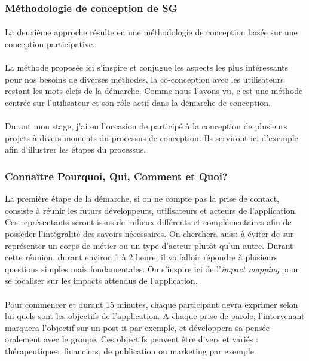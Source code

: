 	
	\subsubsection{Méthodologie de conception de SG}
	\paragraph{}
La deuxième approche résulte en une méthodologie de conception basée sur une conception participative. 

\paragraph{} La méthode proposée ici s'inspire et conjugue les aspects les plus intéressants pour nos besoins de diverses  méthodes, la co-conception avec les utilisateurs restant les mots clefs de la démarche. Comme nous l'avons vu, c'est une méthode centrée sur l'utilisateur et son rôle actif dans la démarche de conception.

\paragraph{} Durant mon stage, j'ai eu l'occasion de participé à la conception de plusieurs projets à divers moments du processus de conception. Ils serviront ici d'exemple afin d'illustrer les étapes du processus.

	\subsubsection*{Connaître Pourquoi, Qui, Comment et Quoi?}
La première étape de la démarche, si on ne compte pas la prise de contact, consiste à réunir les futurs développeurs, utilisateurs et acteurs de l'application. Ces représentants seront issus de milieux différents et complémentaires afin de posséder l'intégralité des savoirs nécessaires. On cherchera aussi à éviter de sur-représenter un corps de métier ou un type d'acteur plutôt qu'un autre. Durant cette réunion, durant environ 1 à 2 heure, il va falloir répondre à plusieurs questions simples mais fondamentales. On s'inspire ici de l'\emph{impact mapping} pour se focaliser sur les impacts attendus de l'application.

\paragraph{}Pour commencer et durant 15 minutes, chaque participant devra exprimer selon lui quels sont les objectifs de l'application. A chaque prise de parole, l'intervenant marquera l'objectif sur un post-it par exemple, et développera sa pensée oralement avec le groupe. Ces objectifs peuvent être divers et variés : thérapeutiques, financiers, de publication ou marketing par exemple. 

